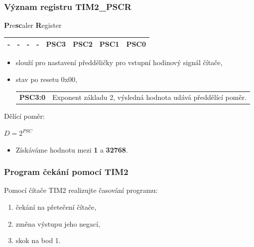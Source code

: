 	\begin{frame}
    \frametitle{Význam registru TIM2\_PSCR}

		\textbf{P}re\textbf{sc}aler \textbf{R}egister

		\begin{center}
			\tiny
			\begin{tabular}{| p{9mm} | p{9mm} | p{9mm} | p{9mm} | p{9mm} | p{9mm} | p{9mm} | p{9mm} |}
				\hline
				\hline
				\textbf{-} & \textbf{-} & \textbf{-} & \textbf{-} & \textbf{PSC3} & \textbf{PSC2} & \textbf{PSC1} & \textbf{PSC0} \\
				\hline
				\hline
			\end{tabular}
		\end{center}
				
		\begin{itemize}
			\item slouží pro nastavení předděličky pro vstupní hodinový signál čítače,
			\item stav po resetu 0x00,
			\small
			\begin{center}
				\begin{tabular}{l p{80mm}}
					\textbf{PSC3:0} & Exponent základu 2, výsledná hodnota udává předdělící poměr. \\
				\end{tabular}
			\end{center}
		\end{itemize}
		
		Dělící poměr:
		\begin{center}
			$D = 2^{PSC}$
		\end{center}
		
		
		\begin{itemize}
			\item Získáváme hodnotu mezi \textbf{1} a \textbf{32768}.
		\end{itemize}
		
	\end{frame}

	\begin{frame}
    \frametitle{Program čekání pomocí TIM2}
		
		Pomocí čítače TIM2 realizujte časování programu:
		\begin{enumerate}
			\item čekání na přetečení čítače,
			\item změna výstupu jeho negací,
			\item skok na bod 1.
		\end{enumerate}
		
	\end{frame}
	
